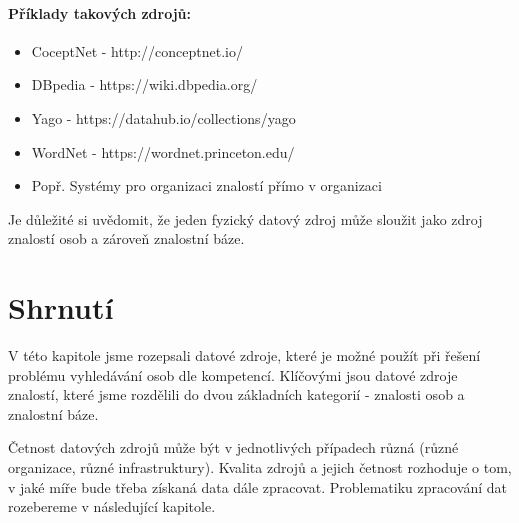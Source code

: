 \paragraph{Příklady takových zdrojů:}
\begin{itemize}
\item CoceptNet - http://conceptnet.io/
\item DBpedia - https://wiki.dbpedia.org/
\item Yago - https://datahub.io/collections/yago
\item WordNet - https://wordnet.princeton.edu/
\item Popř. Systémy pro organizaci znalostí přímo v organizaci
\end{itemize}
Je důležité si uvědomit, že jeden fyzický datový zdroj může sloužit jako zdroj znalostí osob a zároveň znalostní báze.\par
\section{Shrnutí}
V této kapitole jsme rozepsali datové zdroje, které je možné použít při řešení problému vyhledávání osob dle kompetencí. Klíčovými jsou datové zdroje znalostí, které jsme rozdělili do dvou základních kategorií - znalosti osob a znalostní báze.\par
Četnost datových zdrojů může být v jednotlivých případech různá (různé organizace, různé infrastruktury). Kvalita zdrojů a jejich četnost rozhoduje o tom, v jaké míře bude třeba získaná data dále zpracovat. Problematiku zpracování dat rozebereme v následující kapitole.







